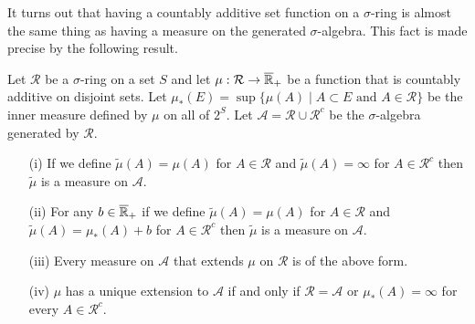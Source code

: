 It turns out that having a countably additive set function on a
$\sigma$-ring is almost the same thing as having a measure on the
generated $\sigma$-algebra.  This fact is made precise by the
following result.
\begin{lem}\label{ExtendingMeasuresFromSigmaRing}Let $\mathcal{R}$ be a $\sigma$-ring on a set $S$ and let
  $\mu : \mathcal{R} \to \overline{\mathbb{R}}_+$ be a function that is
  countably additive on disjoint sets.  Let $\mu_*(E) = \sup \lbrace
  \mu(A) \mid A
  \subset E \text{ and } A \in \mathcal{R} \rbrace$ be the inner measure
  defined by $\mu$ on all of $2^S$.  Let $\mathcal{A} = \mathcal{R}
  \cup \mathcal{R}^c$ be the $\sigma$-algebra generated by
  $\mathcal{R}$.
\begin{itemize}
\item[(i)]If we define $\tilde{\mu}(A) = \mu(A)$ for $A \in
  \mathcal{R}$ and $\tilde{\mu}(A) = \infty$ for $A \in \mathcal{R}^c$
  then $\tilde{\mu}$ is a measure on $\mathcal{A}$.
\item[(ii)]For any $b \in \overline{\mathbb{R}}_+$ if we define
  $\tilde{\mu}(A) = \mu(A)$ for $A \in
  \mathcal{R}$ and $\tilde{\mu}(A) = \mu_*(A) + b$ for $A \in \mathcal{R}^c$
  then $\tilde{\mu}$ is a measure on $\mathcal{A}$.
\item[(iii)]Every measure on $\mathcal{A}$ that extends $\mu$ on
  $\mathcal{R}$ is of the above form.
\item[(iv)]$\mu$ has a unique extension to $\mathcal{A}$ if and only
  if $\mathcal{R} = \mathcal{A}$ or $\mu_*(A) = \infty$ for every $A \in \mathcal{R}^c$.
\end{itemize}
\end{lem}
